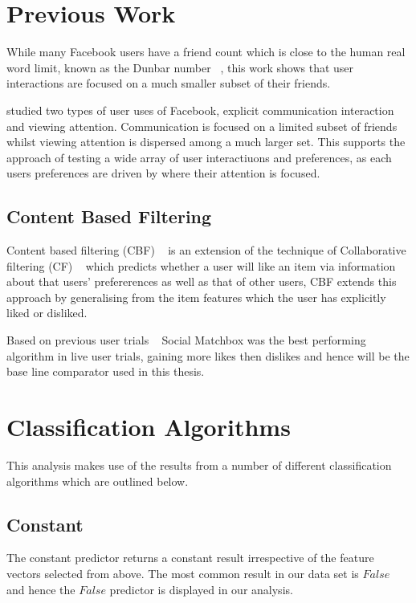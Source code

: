 \section{Previous Work}
\label{sec:pw}

While many Facebook users have a friend count which is close to the human real word limit, known as the Dunbar number ~\cite{hill2003social},
this work shows that user interactions are focused on a much smaller subset of their friends.

\cite{backstrom2011center} studied two types of user uses of Facebook, explicit communication interaction and viewing attention. Communication 
is focused on a limited subset of friends whilst viewing attention is dispersed among a much larger set. This supports the approach of testing
a wide array of user interactiuons and preferences, as each users preferences are driven by where their attention is focused.

\subsection{Content Based Filtering}
\label{sec:cbf}

Content based filtering (CBF) ~\cite{newsweeder} is an extension of the technique of Collaborative filtering (CF) ~\cite{collab_filtering} 
which predicts whether a user will like an item via information about that users' prefererences as well as that of other users, CBF extends 
this approach by generalising from the item features which the user has explicitly liked or disliked.

Based on previous user trials ~\cite{joseph} Social Matchbox was the best performing algorithm in live user trials, gaining more likes then
dislikes and hence will be the base line comparator used in this thesis.

\section{Classification Algorithms}
\label{sec:meth}

This analysis makes use of the results from a number of different classification algorithms which are outlined below.

\subsection{Constant}
\label{sec:const}

The constant predictor returns a constant result irrespective of the feature vectors selected from above. The most common result in our data
set is $False$ and hence the $False$ predictor is displayed in our analysis.

